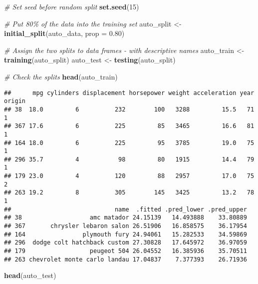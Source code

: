 \documentclass[
]{article}
\newenvironment{Shaded}{\begin{snugshade}}{\end{snugshade}}
\newcommand{\AttributeTok}[1]{\textcolor[rgb]{0.13,0.29,0.53}{#1}}
\newcommand{\CommentTok}[1]{\textcolor[rgb]{0.56,0.35,0.01}{\textit{#1}}}
\newcommand{\DecValTok}[1]{\textcolor[rgb]{0.00,0.00,0.81}{#1}}
\newcommand{\FloatTok}[1]{\textcolor[rgb]{0.00,0.00,0.81}{#1}}
\newcommand{\FunctionTok}[1]{\textcolor[rgb]{0.13,0.29,0.53}{\textbf{#1}}}
\newcommand{\NormalTok}[1]{#1}
\newcommand{\OtherTok}[1]{\textcolor[rgb]{0.56,0.35,0.01}{#1}}
\begin{document}
\begin{Shaded}
\begin{Highlighting}[]
\CommentTok{\# Set seed before random split}
\FunctionTok{set.seed}\NormalTok{(}\DecValTok{15}\NormalTok{)}

\CommentTok{\# Put 80\% of the data into the training set}
\NormalTok{auto\_split }\OtherTok{\textless{}{-}} \FunctionTok{initial\_split}\NormalTok{(auto\_data, }\AttributeTok{prop =} \FloatTok{0.80}\NormalTok{)}

\CommentTok{\# Assign the two splits to data frames {-} with descriptive names}
\NormalTok{auto\_train }\OtherTok{\textless{}{-}} \FunctionTok{training}\NormalTok{(auto\_split)}
\NormalTok{auto\_test }\OtherTok{\textless{}{-}} \FunctionTok{testing}\NormalTok{(auto\_split)}

\CommentTok{\# Check the splits}
\FunctionTok{head}\NormalTok{(auto\_train)}
\end{Highlighting}
\end{Shaded}

\begin{verbatim}
##      mpg cylinders displacement horsepower weight acceleration year origin
## 38  18.0         6          232        100   3288         15.5   71      1
## 367 17.6         6          225         85   3465         16.6   81      1
## 164 18.0         6          225         95   3785         19.0   75      1
## 296 35.7         4           98         80   1915         14.4   79      1
## 179 23.0         4          120         88   2957         17.0   75      2
## 263 19.2         8          305        145   3425         13.2   78      1
##                             name  .fitted .pred_lower .pred_upper
## 38                   amc matador 24.15139   14.493888    33.80889
## 367       chrysler lebaron salon 26.51906   16.858575    36.17954
## 164                plymouth fury 24.94061   15.282533    34.59869
## 296  dodge colt hatchback custom 27.30828   17.645972    36.97059
## 179                  peugeot 504 26.04552   16.385936    35.70511
## 263 chevrolet monte carlo landau 17.04837    7.377393    26.71936
\end{verbatim}

\begin{Shaded}
\begin{Highlighting}[]
\FunctionTok{head}\NormalTok{(auto\_test)}
\end{Highlighting}
\end{Shaded}
\end{document}
